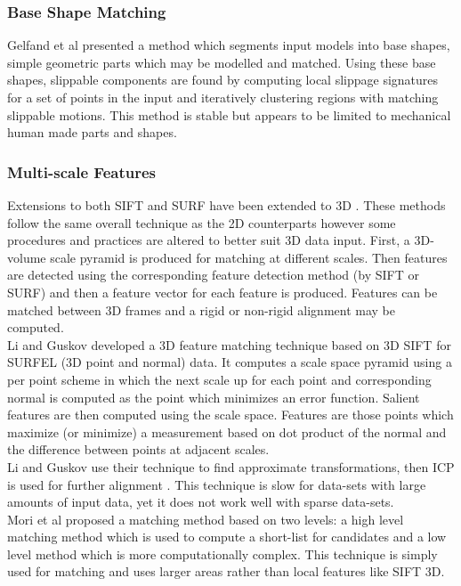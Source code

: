 \subsubsection{Base Shape Matching}

Gelfand et al \cite{Gelfand04Shape} presented a method which segments input models into base shapes, simple geometric parts which may be modelled and matched. Using these base shapes, slippable components are found by computing local slippage signatures for a set of points in the input and iteratively clustering regions with matching slippable motions. This method is stable but appears to be limited to mechanical human made parts and shapes.

\subsubsection{Multi-scale Features}

Extensions to both SIFT and SURF have been extended to 3D \cite{Scovanner073Dimensional,Flitton10Object}. These methods follow the same overall technique as the 2D counterparts however some procedures and practices are altered to better suit 3D data input. First, a 3D-volume scale pyramid is produced for matching at different scales. Then features are detected using the corresponding feature detection method (by SIFT or SURF) and then a feature vector for each feature is produced. Features can be matched between 3D frames and a rigid or non-rigid alignment may be computed. \\

Li and Guskov \cite{Li05Multiscale} developed a 3D feature matching technique based on 3D SIFT for SURFEL (3D point and normal) data. It computes a scale space pyramid using a per point scheme in which the next scale up for each point and corresponding normal is computed as the point which minimizes an error function. Salient features are then computed using the scale space. Features are those points which maximize (or minimize) a measurement based on dot product of the normal and the difference between points at adjacent scales. \\

Li and Guskov use their technique to find approximate transformations, then ICP is used for further alignment \cite{Besl92Method,Chen92Object}. This technique is slow for data-sets with large amounts of input data, yet it does not work well with sparse data-sets. \\

	
Mori et al \cite{Mori05Efficient} proposed a matching method based on two levels: a high level matching method which is used to compute a short-list for candidates and a low level method which is more computationally complex. This technique is simply used for matching and uses larger areas rather than local features like SIFT 3D. \\

